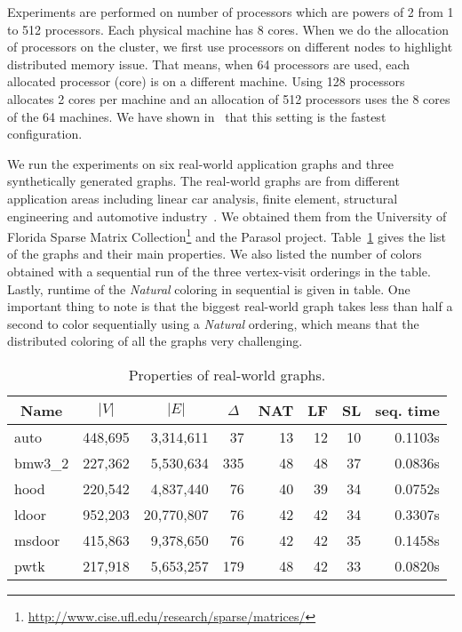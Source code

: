 \documentclass{article}
\newcommand{\card}[1]{\ensuremath{|#1|}}
\newcommand{\maxdegree}{\ensuremath{\Delta}}
\begin{document}
Experiments are performed on number of processors which are powers of
2 from 1 to 512 processors. Each physical machine has 8
cores. When we do the allocation of processors on the cluster, we first
use processors on different nodes to highlight distributed memory
issue. That means, when 64 processors are used, each allocated processor (core)
is on a different machine. Using 128 processors allocates 2 cores per
machine and an allocation of 512 processors uses the 8 cores of the 64
machines. We have shown in~\cite{HiPC11} that this setting is the fastest configuration.

We run the experiments on six real-world application graphs and three
synthetically generated graphs. The real-world graphs are from different
application areas including linear car analysis, finite element,
structural engineering and automotive industry~\cite{GM00,SH04}. We
obtained them from the University of Florida Sparse Matrix
Collection\footnote{\url{http://www.cise.ufl.edu/research/sparse/matrices/}}
and the Parasol project. Table~\ref{tab:prop_real} gives the list of
the graphs and their main properties. We also listed the number of
colors obtained with a sequential run of the three vertex-visit
orderings in the table. Lastly, runtime of
the {\em Natural} coloring in sequential is given in table. One important thing
to note is that the biggest real-world graph takes less than half a second to color sequentially
using a {\em Natural} ordering, which means that the distributed coloring of all the
graphs very challenging.


\begin{table}
  \centering
  \begin{tabular}{|l|r|r|r|r|r|r|r|} \hline
    \multicolumn{1}{|c|}{Name} & \multicolumn{1}{|c|}{$\card{V}$} & \multicolumn{1}{|c|}{$\card{E}$} & \multicolumn{1}{|c|}{$\maxdegree$} & \multicolumn{1}{|c|}{NAT} & \multicolumn{1}{|c|}{LF} & \multicolumn{1}{|c|}{SL} &\multicolumn{1}{|c|}{seq. time}\\\hline
    auto    & 448,695    &  3,314,611 &  37 & 13&12&10&0.1103s\\
    bmw3\_2 & 227,362    &  5,530,634 & 335 & 48&48&37&0.0836s\\
    hood    & 220,542    &  4,837,440 &  76 & 40&39&34&0.0752s\\
    ldoor   & 952,203    & 20,770,807 &  76 & 42&42&34&0.3307s\\
    msdoor  & 415,863    &  9,378,650 &  76 & 42&42&35&0.1458s\\
    pwtk    & 217,918    &  5,653,257 & 179 & 48&42&33&0.0820s\\ \hline
  \end{tabular}
  \caption{Properties of real-world graphs.}
  \label{tab:prop_real}
\end{table}
\end{document}
